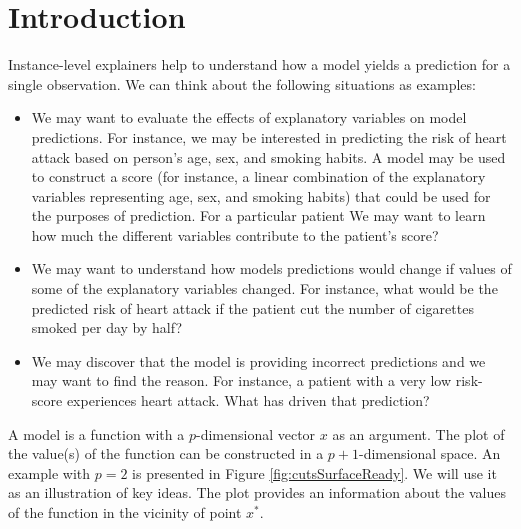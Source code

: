 \documentclass[]{krantz}
\providecommand{\tightlist}{%
  \setlength{\itemsep}{0pt}\setlength{\parskip}{0pt}}
\theoremstyle{definition}
\theoremstyle{definition}
\theoremstyle{definition}
\theoremstyle{remark}
\begin{document}
\hypertarget{PredictionExplainers}{%
\section{Introduction}\label{PredictionExplainers}}

Instance-level explainers help to understand how a model yields a
prediction for a single observation. We can think about the following
situations as examples:

\begin{itemize}
\tightlist
\item
  We may want to evaluate the effects of explanatory variables on model
  predictions. For instance, we may be interested in predicting the risk
  of heart attack based on person's age, sex, and smoking habits. A
  model may be used to construct a score (for instance, a linear
  combination of the explanatory variables representing age, sex, and
  smoking habits) that could be used for the purposes of prediction. For
  a particular patient We may want to learn how much the different
  variables contribute to the patient's score?
\item
  We may want to understand how models predictions would change if
  values of some of the explanatory variables changed. For instance,
  what would be the predicted risk of heart attack if the patient cut
  the number of cigarettes smoked per day by half?
\item
  We may discover that the model is providing incorrect predictions and
  we may want to find the reason. For instance, a patient with a very
  low risk-score experiences heart attack. What has driven that
  prediction?
\end{itemize}

A model is a function with a \(p\)-dimensional vector \(x\) as an
argument. The plot of the value(s) of the function can be constructed in
a \(p+1\)-dimensional space. An example with \(p=2\) is presented in
Figure \ref{fig:cutsSurfaceReady}. We will use it as an illustration of
key ideas. The plot provides an information about the values of the
function in the vicinity of point \(x^*\).
\end{document}
